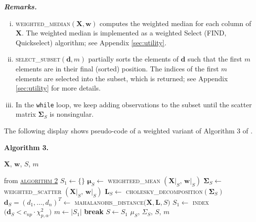 \documentclass[a4paper,oneside,11pt,DIV=12]{scrartcl}
\newcommand{\code}[1]{{\texttt{#1}}}
\begin{document}
\vspace{1em}
\noindent\textbf{\sffamily \small \itshape Remarks.}
\vspace{-0.5em}
\begin{enumerate}[i)]
	\item \textsc{weighted\_median}$(\bm X, \bm w)$ computes the weighted
		median for each column of $\bm X$. The weighted median is implemented
		as a weighted Select (FIND, Quickselect) algorithm; see Appendix
		\ref{sec:utility}.
	\item \textsc{select\_subset}$(\bm d, m)$ partially sorts the elements
		of $\bm d$ such that the first $m$ elements are in their final
		(sorted) position. The indices of the first $m$ elements are
		selected into the subset, which is returned; see Appendix
		\ref{sec:utility} for more details.
	\item In the \code{while} loop, we keep adding observations to the
		subset until the scatter matrix $\bm \Sigma_S$ is nonsingular.
\end{enumerate}

\vspace{1em}
\noindent The following display shows pseudo-code of a weighted variant
of Algorithm 3 of \citet{billor_hadi_etal_2000}.

\vspace{1em}
\noindent \textbf{\sffamily Algorithm 3.}
\begin{algorithmic}[1]
	\hypertarget{alg:alg3}{\Require $\bm X$, $\bm w$, $S$, $m$} from
		\hyperlink{alg:alg2}{\textsc{algorithm} 2}
	\State $S_1 \gets \{\}$
		\State $\bm \mu_S \gets$ \textsc{weighteed\_mean}
			$(\bm X\vert_S,\, \bm w\vert_S)$
		\State $\bm \Sigma_S \gets$ \textsc{weighted\_scatter}
			$(\bm X\vert_S, \, \bm w\vert_S)$
		\State $\bm L_S \gets$ \textsc{cholesky\_decomposition}$(\bm \Sigma_S)$
		\State $\bm d_S = (d_1, \ldots, d_n)^T  \gets$
			\textsc{mahalanobis\_distance}$\big(\bm X, \bm L, S \big)$
		\State $S_1 \gets$ \textsc{index}
			$\big( \bm d_S < c_{np}\cdot \chi_{p,\alpha}^2\big)$
		\State $m \gets \vert S_1\vert$
			\State \textbf{break}
		\EndIf
		\State $S \gets S_1$
	\EndWhile
	\State \Return $\mu_S$, $\Sigma_S$, $S$, $m$
\end{algorithmic}
\end{document}
